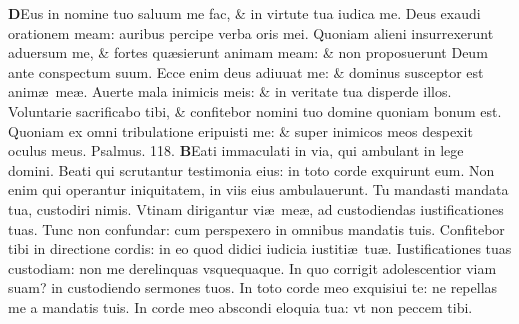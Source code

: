 \documentclass[a5paper,10pt]{book}
\def\ae{æ}
\begin{document}
\begin{multicols*}{2}
\vspace{-.25em}
\lettrine[lines=2]{\bfseries D}{}Eus in nomine tuo saluum me fac, \& in virtute tua iudica me.
\newline \color{red} D\color{black}eus exaudi orationem meam: auribus percipe verba oris mei.
\newline \color{red} Q\color{black}uoniam alieni insurrexerunt aduersum me, \& fortes qu\ae sierunt animam meam: \& non proposuerunt Deum ante conspectum suum.
\newline \color{red} E\color{black}cce enim deus adiuuat me: \& dominus susceptor est anim\ae \ me\ae .
\newline \color{red} A\color{black}uerte mala inimicis meis: \& in veritate tua disperde illos.
\newline \color{red} V\color{black}oluntarie sacrificabo tibi, \& confitebor nomini tuo domine quoniam bonum est.
\newline \color{red} Q\color{black}uoniam ex omni tribulatione eripuisti me: \& super inimicos meos despexit oculus meus. \quad \color{red} Psalmus. \hypertarget{ps118.1}{118.} \color{black}
\vspace{-.25em}
\lettrine[lines=2]{\bfseries \color{red} B}{}Eati immaculati in via, qui ambulant in lege domini.
\newline \color{red} B\color{black}eati qui scrutantur testimonia eius: in toto corde exquirunt eum.
\newline \color{red} N\color{black}on enim qui operantur iniquitatem, in viis eius ambulauerunt.
\newline \color{red} T\color{black}u mandasti mandata tua, custodiri nimis.
\newline \color{red} V\color{black}tinam dirigantur vi\ae \ me\ae , ad custodiendas iustificationes tuas.
\newline \color{red} T\color{black}unc non confundar: cum perspexero in omnibus mandatis tuis.
\newline \color{red} C\color{black}onfitebor tibi in directione cordis: in eo quod didici iudicia iustiti\ae \ tu\ae .
\newline \color{red} I\color{black}ustificationes tuas custodiam: non me derelinquas vsquequaque.
\newline \color{red} I\color{black}n quo corrigit adolescentior viam suam? in custodiendo sermones tuos.
\newline \color{red} I\color{black}n toto corde meo exquisiui te: ne repellas me a mandatis tuis.
\newline \color{red} I\color{black}n corde meo abscondi eloquia tua: vt non peccem tibi.

\end{multicols*}
\end{document}
